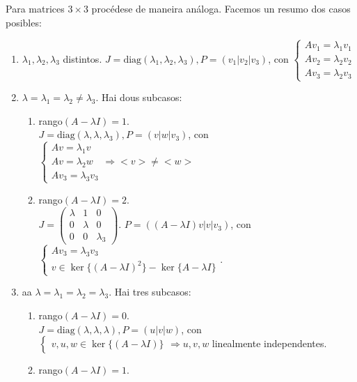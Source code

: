 \documentclass[11pt, a4paper,twoside]{article}
\theoremstyle{theorem-style}  %
\theoremstyle{definition-style}
\theoremstyle{example-style}
\begin{document}
Para matrices $ 3\times 3 $ procédese de maneira análoga. Facemos un resumo dos casos posibles:
\begin{enumerate}
	\item $ \lambda_1,\lambda_2,\lambda_3 $ distintos. $ J=\text{diag}(\lambda_1,\lambda_2,\lambda_3), P=(v_1|v_2|v_3) $, con $ \begin{cases}
	Av_1=\lambda_1v_1\\
	Av_2=\lambda_2v_2\\
	Av_3=\lambda_2v_3
	\end{cases} $
	\item $ \lambda= \lambda_1=\lambda_2\neq \lambda_3 $. Hai dous subcasos:
	\begin{enumerate}
		\item rango$ (A-\lambda I )= 1 $. \\
		$ J=\text{diag}(\lambda,\lambda,\lambda_3), P=(v|w|v_3) $, con $ \begin{cases}
		Av=\lambda_1v\\
		Av=\lambda_2w\\
		Av_3=\lambda_3v_3
		\end{cases}\Rightarrow <v>\neq <w> $
		\item rango$ (A-\lambda I )= 2 $. \\
		 $ J=\begin{pmatrix}
		\lambda &1 &0\\
		0 &\lambda &0\\
		0 &0 &\lambda_3
		\end{pmatrix} $. $ P=((A-\lambda I)v|v|v_3) $, con $ \begin{cases}
		Av_3=\lambda_3v_3\\
		v \in \ker\{(A-\lambda I)^2\}-\ker\{A-\lambda I\}
		\end{cases}$.
	\end{enumerate}
	\item aa $ \lambda= \lambda_1=\lambda_2= \lambda_3 $. Hai tres subcasos:
	\begin{enumerate}
		\item rango$ (A-\lambda I )= 0 $. \\
		$ J=\text{diag}(\lambda,\lambda,\lambda), P=(u|v|w) $, con $ \begin{cases}
		v,u,w \in \ker\{(A-\lambda I)\}
		\end{cases}\Rightarrow u,v,w $ linealmente independentes.
		\item rango$ (A-\lambda I )= 1 $. \\

\end{enumerate}
\end{enumerate}
\end{document}
